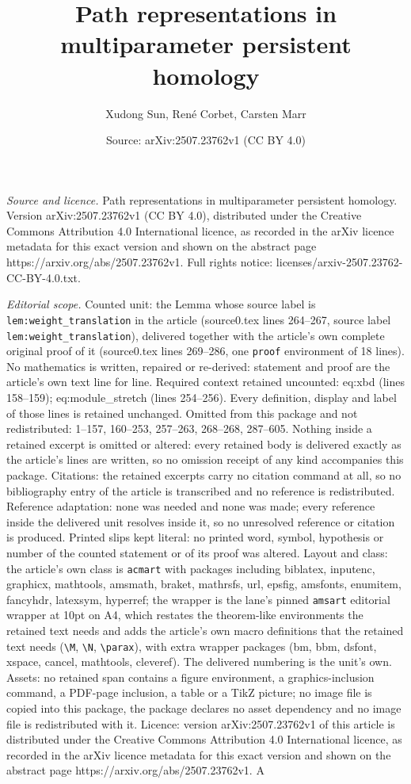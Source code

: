 \documentclass[10pt,a4paper]{amsart}
\title[Path representations in multiparameter persistent homology]{Path representations in multiparameter persistent homology}
\author{Xudong Sun, Ren\'e Corbet, Carsten Marr}
\date{Source: arXiv:2507.23762v1 (CC BY 4.0)}
\begin{document}
\maketitle

\noindent\emph{Source and licence.} Path representations in multiparameter persistent homology. Version arXiv:2507.23762v1 (CC BY 4.0), distributed under the Creative Commons Attribution 4.0 International licence, as recorded in the arXiv licence metadata for this exact version and shown on the abstract page https://arxiv.org/abs/2507.23762v1. Full rights notice: licenses/arxiv-2507.23762-CC-BY-4.0.txt.\par\smallskip

\noindent\textit{Editorial scope.} Counted unit: the Lemma whose source label is \texttt{lem:weight\_translation} in the article (source0.tex lines 264--267, source label \texttt{lem:weight\_translation}), delivered together with the article's own complete original proof of it (source0.tex lines 269--286, one \texttt{proof} environment of 18 lines). No mathematics is written, repaired or re-derived: statement and proof are the article's own text line for line. Required context retained uncounted: eq:xbd (lines 158--159); eq:module\_stretch (lines 254--256). Every definition, display and label of those lines is retained unchanged. Omitted from this package and not redistributed: 1--157, 160--253, 257--263, 268--268, 287--605. Nothing inside a retained excerpt is omitted or altered: every retained body is delivered exactly as the article's lines are written, so no omission receipt of any kind accompanies this package. Citations: the retained excerpts carry no citation command at all, so no bibliography entry of the article is transcribed and no reference is redistributed. Reference adaptation: none was needed and none was made; every reference inside the delivered unit resolves inside it, so no unresolved reference or citation is produced. Printed slips kept literal: no printed word, symbol, hypothesis or number of the counted statement or of its proof was altered. Layout and class: the article's own class is \texttt{acmart} with packages including biblatex, inputenc, graphicx, mathtools, amsmath, braket, mathrsfs, url, epsfig, amsfonts, enumitem, fancyhdr, latexsym, hyperref; the wrapper is the lane's pinned \texttt{amsart} editorial wrapper at 10pt on A4, which restates the theorem-like environments the retained text needs and adds the article's own macro definitions that the retained text needs (\texttt{\textbackslash M}, \texttt{\textbackslash N}, \texttt{\textbackslash parax}), with extra wrapper packages (bm, bbm, dsfont, xspace, cancel, mathtools, cleveref). The delivered numbering is the unit's own. Assets: no retained span contains a figure environment, a graphics-inclusion command, a PDF-page inclusion, a table or a TikZ picture; no image file is copied into this package, the package declares no asset dependency and no image file is redistributed with it. Licence: version arXiv:2507.23762v1 of this article is distributed under the Creative Commons Attribution 4.0 International licence, as recorded in the arXiv licence metadata for this exact version and shown on the abstract page https://arxiv.org/abs/2507.23762v1. A 
\end{document}
